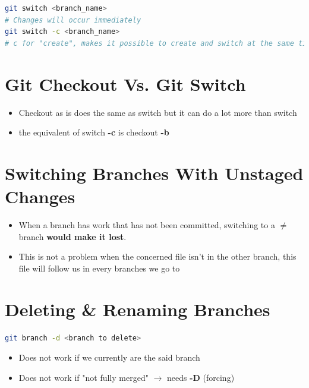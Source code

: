 \documentclass{report}
\newcommand{\warning}{
	{\fontencoding{U}\fontfamily{futs}\selectfont\char 66\relax}
}
\begin{document}
\begin{tcolorbox}[title=Switching Branches,colback=backcolour]
\begin{lstlisting}[language=bash]
git switch <branch_name>
# Changes will occur immediately
git switch -c <branch_name>
# c for "create", makes it possible to create and switch at the same time
\end{lstlisting}
\end{tcolorbox}


\section{Git Checkout Vs. Git Switch}

\begin{itemize}
	\item Checkout as is does the same as switch but it can do a lot more than switch 
	\item \warning the equivalent of switch \textbf{-c} is checkout \textbf{-b} 
\end{itemize}


\section{Switching Branches With Unstaged Changes}

\begin{itemize}
	\item When a branch has work that has not been committed, switching to a $\not =$ branch \textbf{would make it lost}. 
	\item This is not a problem when the concerned file isn't in the other branch, this file will follow us in every branches we go to
\end{itemize}


\section{Deleting \& Renaming Branches}

\begin{tcolorbox}[title=Delete Branches,colback=backcolour]
\begin{lstlisting}[language=bash]
git branch -d <branch to delete>
\end{lstlisting}
\begin{itemize}
	\item Does not work if we currently are the said branch 
	\item Does not work if "not fully merged" $\rightarrow$ needs \textbf{-D} (forcing) 
\end{itemize}
\end{tcolorbox}
\end{document}
